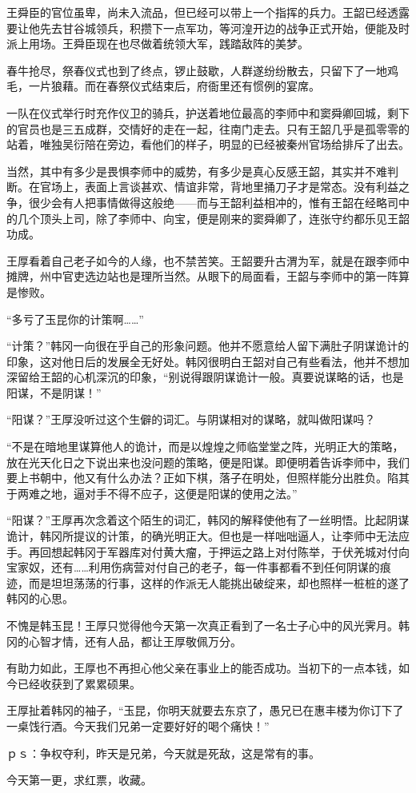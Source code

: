 王舜臣的官位虽卑，尚未入流品，但已经可以带上一个指挥的兵力。王韶已经透露要让他先去甘谷城领兵，积攒下一点军功，等河湟开边的战争正式开始，便能及时派上用场。王舜臣现在也尽做着统领大军，践踏敌阵的美梦。

春牛抢尽，祭春仪式也到了终点，锣止鼓歇，人群遂纷纷散去，只留下了一地鸡毛，一片狼藉。而在春祭仪式结束后，府衙里还有惯例的宴席。

一队在仪式举行时充作仪卫的骑兵，护送着地位最高的李师中和窦舜卿回城，剩下的官员也是三五成群，交情好的走在一起，往南门走去。只有王韶几乎是孤零零的站着，唯独吴衍陪在旁边，看他们的样子，明显的已经被秦州官场给排斥了出去。

当然，其中有多少是畏惧李师中的威势，有多少是真心反感王韶，其实并不难判断。在官场上，表面上言谈甚欢、情谊非常，背地里捅刀子才是常态。没有利益之争，很少会有人把事情做得这般绝——而与王韶利益相冲的，惟有王韶在经略司中的几个顶头上司，除了李师中、向宝，便是刚来的窦舜卿了，连张守约都乐见王韶功成。

王厚看着自己老子如今的人缘，也不禁苦笑。王韶要升古渭为军，就是在跟李师中摊牌，州中官吏选边站也是理所当然。从眼下的局面看，王韶与李师中的第一阵算是惨败。

“多亏了玉昆你的计策啊……”

“计策？”韩冈一向很在乎自己的形象问题。他并不愿意给人留下满肚子阴谋诡计的印象，这对他日后的发展全无好处。韩冈很明白王韶对自己有些看法，他并不想加深留给王韶的心机深沉的印象，“别说得跟阴谋诡计一般。真要说谋略的话，也是阳谋，不是阴谋！”

“阳谋？”王厚没听过这个生僻的词汇。与阴谋相对的谋略，就叫做阳谋吗？

“不是在暗地里谋算他人的诡计，而是以煌煌之师临堂堂之阵，光明正大的策略，放在光天化日之下说出来也没问题的策略，便是阳谋。即便明着告诉李师中，我们要上书朝中，他又有什么办法？正如下棋，落子在明处，但照样能分出胜负。陷其于两难之地，逼对手不得不应子，这便是阳谋的使用之法。”

“阳谋？”王厚再次念着这个陌生的词汇，韩冈的解释使他有了一丝明悟。比起阴谋诡计，韩冈所提议的计策，的确光明正大。但也是一样咄咄逼人，让李师中无法应手。再回想起韩冈于军器库对付黄大瘤，于押运之路上对付陈举，于伏羌城对付向宝家奴，还有……利用伤病营对付自己的老子，每一件事都看不到任何阴谋的痕迹，而是坦坦荡荡的行事，这样的作派无人能挑出破绽来，却也照样一桩桩的遂了韩冈的心思。

不愧是韩玉昆！王厚只觉得他今天第一次真正看到了一名士子心中的风光霁月。韩冈的心智才情，还有人品，都让王厚敬佩万分。

有助力如此，王厚也不再担心他父亲在事业上的能否成功。当初下的一点本钱，如今已经收获到了累累硕果。

王厚扯着韩冈的袖子，“玉昆，你明天就要去东京了，愚兄已在惠丰楼为你订下了一桌饯行酒。今天我们兄弟一定要好好的喝个痛快！”

ｐｓ：争权夺利，昨天是兄弟，今天就是死敌，这是常有的事。

今天第一更，求红票，收藏。

